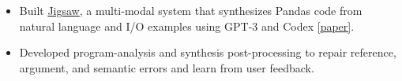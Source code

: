 \documentclass[10pt,a4paper,ragged2e]{altacv}
\begin{document}
\divider

\begin{itemize}
    \item Built \href{https://www.microsoft.com/en-us/research/project/project-jigsaw/}{Jigsaw}, a multi-modal system that synthesizes Pandas code from natural language and I/O examples using GPT-3 and Codex \href{https://arxiv.org/html/2112.02969v1}{[paper]}.
    \item Developed program-analysis and synthesis post-processing to repair reference, argument, and semantic errors and learn from user feedback.
\end{itemize}



\end{document}
